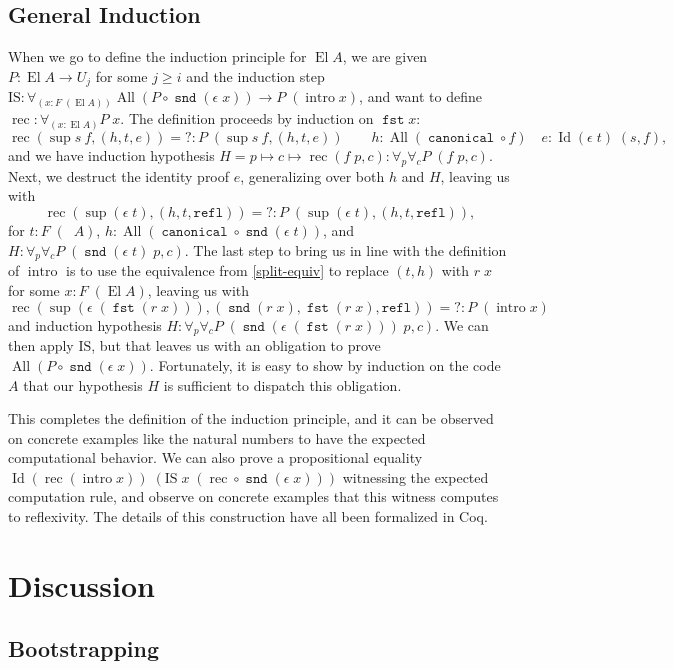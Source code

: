 \documentclass[a4paper,UKenglish,cleveref,nameinlink,autoref,thm-restate]{lipics-v2019}
\DeclareMathOperator{\supop}{sup}
\renewcommand{\sup}[2]{\supop {#1}\:\!{#2}}
\DeclareMathOperator{\Idop}{\mathrm{Id}}
\newcommand{\Id}[2]{\Idop {#1}\;{#2}}
\newcommand{\refl}{\mathtt{refl}}
\DeclareMathOperator{\fst}{\mathtt{fst}}
\DeclareMathOperator{\snd}{\mathtt{snd}}
\DeclareMathOperator{\canonical}{\hyperref[define-canonical]{\mathtt{canonical}}}
\newcommand{\IS}{\mathrm{IS}}
\DeclareMathOperator{\El}{El}
\DeclareMathOperator{\preEl}{\tilde{El}}
\DeclareMathOperator{\intro}{intro}
\DeclareMathOperator{\rec}{rec}
\DeclareMathOperator{\All}{All}
\begin{document}
\subsection{General Induction}
When we go to define the induction principle for $\El A$, we are given $P : \El A \to U_j$ for some $j \geq i$ and the induction step $\IS : \forall_{(x : F\;(\El A))}\All(P \circ \snd(\epsilon\;x)) \to P\;(\intro x)$, and want to define $\rec : \forall_{(x : \El A)}P\;x$. The definition proceeds by induction on $\fst x$:
\[\rec(\sup{s}{f},(h,t,e)) ={} ? : P\;(\sup{s}{f},(h,t,e))\qquad h : \All(\canonical \circ f) \quad  e : \Id{(\epsilon \;t)}{(s,f)},\] and we have induction hypothesis $H = p \mapsto c \mapsto \rec(f\;p,c) : \forall_p\forall_c P\;(f\;p,c)$. Next, we destruct the identity proof $e$, generalizing over both $h$ and $H$, leaving us with
\[\rec(\supop(\epsilon\;t),(h,t,\refl)) ={} ? : P\;(\supop(\epsilon\;t),(h,t,\refl)),\] for $t : F\;(\preEl A)$, $h : \All(\canonical\circ\snd(\epsilon\;t))$, and $H : \forall_p\forall_cP\;(\snd(\epsilon\;t)\;p,c)$. The last step to bring us in line with the definition of $\intro$ is to use the equivalence from \cref{split-equiv} to replace $(t, h)$ with $r\;x$ for some $x : F\;(\El A)$, leaving us with
\[\rec(\supop(\epsilon\;(\fst(r\;x))),(\snd(r\;x),\fst(r\;x),\refl)) ={} ? : P\;(\intro x)\]
and induction hypothesis $H : \forall_p\forall_c P\;(\snd(\epsilon\;(\fst(r\;x)))\;p,c)$. We can then apply $\IS$, but that leaves us with an obligation to prove $\All (P\circ\snd(\epsilon\;x))$. Fortunately, it is easy to show by induction on the code $A$ that our hypothesis $H$ is sufficient to dispatch this obligation.

This completes the definition of the induction principle, and it can be observed on concrete examples like the natural numbers to have the expected computational behavior. We can also prove a propositional equality $\Id{(\rec(\intro x))}{(\IS\;x\;(\rec\circ \snd(\epsilon\;x)))}$ witnessing the expected computation rule, and observe on concrete examples that this witness computes to reflexivity. The details of this construction have all been formalized in Coq.

\section{Discussion}

\subsection{Bootstrapping}
\end{document}
